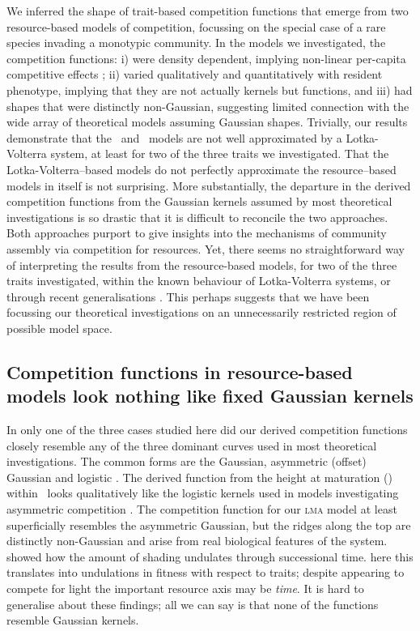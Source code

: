\documentclass[a4paper,11pt]{article}
\begin{document}
We inferred the shape of trait-based competition functions that emerge
from two resource-based models of competition, focussing on the
special case of a rare species invading a monotypic community.
%
In the models we investigated, the competition functions: i) were
density dependent, implying non-linear per-capita competitive effects
\citep{Abrams-1980}; ii) varied qualitatively and quantitatively with
resident phenotype,
implying that they are not actually kernels but functions,
%
and iii) had shapes that were distinctly non-Gaussian, suggesting
limited connection with the wide array of theoretical models assuming
Gaussian shapes.
%
Trivially, our results demonstrate that the \Rstar\ and \plant\ models
are not well approximated by a Lotka-Volterra system, at least for two
of the three traits we investigated. That the Lotka-Volterra--based
models do not perfectly approximate the resource--based models in
itself is not surprising.
%
More substantially, the departure in the derived competition functions
from the Gaussian kernels assumed by most theoretical investigations
is so drastic that it is difficult to reconcile the two approaches.
Both approaches purport to give insights into the mechanisms of
community assembly via competition for resources.  Yet, there seems no
straightforward way of interpreting the results from the
resource-based models, for two of the three traits investigated,
within the known behaviour of Lotka-Volterra systems, or through
recent generalisations \citep{Leimar-2013}. This perhaps suggests that
we have been focussing our theoretical investigations on an
unnecessarily restricted region of possible model space.

\subsection{Competition functions in resource-based models look nothing like
fixed Gaussian kernels}

In only one of the three cases studied here did our derived
competition functions closely resemble any of the three dominant
curves used in most theoretical investigations. The common forms are
the Gaussian, asymmetric (offset) Gaussian \citep{Roughgarden-1979}
and logistic \citep[e.g.][]{Kisdi-1999, Law-1997}.  The derived
function from the height at maturation (\hmat) within \plant\ looks
qualitatively like the logistic kernels used in models investigating
asymmetric competition \citep{Law-1997, Geritz-1999, Kisdi-1999,
  Calcagno-2006}. The competition function for our \textsc{lma} model
at least superficially resembles the asymmetric Gaussian, but the
ridges along the top are distinctly non-Gaussian and arise from real
biological features of the system.
%
\citet{Falster-2011} showed how the amount of shading undulates
through successional time. here this translates into undulations in
fitness with respect to traits; despite appearing to compete for light
the important resource axis may be \emph{time}.
%
It is hard to generalise about these findings; all we can say is that
none of the functions resemble Gaussian kernels.
\end{document}
